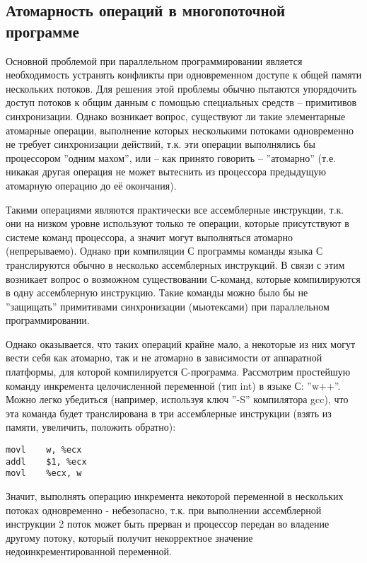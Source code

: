 \subsection{Атомарность операций в многопоточной программе}
\label{atomic:section}

Основной проблемой при параллельном программировании является необходимость устранять конфликты при одновременном доступе к общей памяти нескольких потоков. Для решения этой проблемы обычно пытаются упорядочить доступ потоков к общим данным с помощью специальных средств – примитивов синхронизации. Однако возникает вопрос, существуют ли такие элементарные атомарные операции, выполнение которых несколькими потоками одновременно не требует синхронизации действий, т.к. эти операции выполнялись бы процессором ''одним махом'', или – как принято говорить – ''атомарно'' (т.е. никакая другая операция не может вытеснить из процессора предыдущую атомарную операцию до её окончания).

Такими операциями являются практически все ассемблерные инструкции, т.к. они на низком уровне используют только те операции, которые присутствуют в системе команд процессора, а значит могут выполняться атомарно (непрерываемо). Однако при компиляции С программы команды языка С транслируются обычно в несколько ассемблерных инструкций. В связи с этим возникает вопрос о возможном существовании С-команд, которые компилируются в одну ассемблерную инструкцию. Такие команды можно было бы не ''защищать'' примитивами синхронизации (мьютексами) при параллельном программировании.

Однако оказывается, что таких операций крайне мало, а некоторые из них могут вести себя как атомарно, так и не атомарно в зависимости от аппаратной платформы, для которой компилируется С-программа. Рассмотрим простейшую команду инкремента целочисленной переменной (тип int) в языке С: ''w++''. Можно легко убедиться (например, используя ключ ''-S'' компилятора gcc), что эта команда будет транслирована в три ассемблерные инструкции (взять из памяти, увеличить, положить обратно):

\begin{verbatim}
movl	w, %ecx
addl	$1, %ecx
movl	%ecx, w
\end{verbatim}

Значит, выполнять операцию инкремента некоторой переменной в нескольких потоках одновременно - небезопасно, т.к. при выполнении ассемблерной инструкции 2 поток может быть прерван и процессор передан во владение другому потоку, который получит некорректное значение недоинкрементированной переменной.


